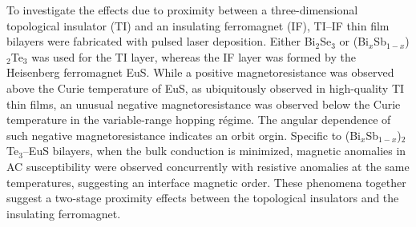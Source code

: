 To investigate the effects due to proximity between a three-dimensional topological insulator (TI) and an insulating ferromagnet (IF), TI--IF thin film bilayers were fabricated with pulsed laser deposition. Either Bi$_2$Se$_3$ or (Bi$_x$Sb$_{1-x}$)$_2$Te$_3$ was used for the TI layer, whereas the IF layer was formed by the Heisenberg ferromagnet EuS. While a positive magnetoresistance was observed above the Curie temperature of EuS, as ubiquitously observed in high-quality TI thin films, an unusual negative magnetoresistance was observed below the Curie temperature in the variable-range hopping r\'egime. The angular dependence of such negative magnetoresistance indicates an orbit orgin. Specific to (Bi$_x$Sb$_{1-x}$)$_2$Te$_3$--EuS bilayers, when the bulk conduction is minimized, magnetic anomalies in AC susceptibility were observed concurrently with resistive anomalies at the same temperatures, suggesting an interface magnetic order. These phenomena together suggest a two-stage proximity effects between the topological insulators and the insulating ferromagnet.